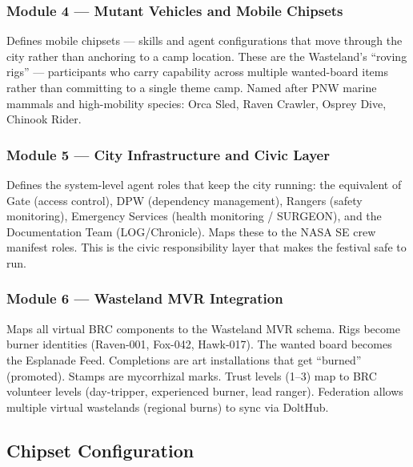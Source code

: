 \documentclass[11pt,letterpaper]{article}
\begin{document}
\subsubsection{Module 4 --- Mutant Vehicles and Mobile Chipsets}
Defines mobile chipsets --- skills and agent configurations that move through the city rather than anchoring to a camp location. These are the Wasteland's ``roving rigs'' --- participants who carry capability across multiple wanted-board items rather than committing to a single theme camp. Named after PNW marine mammals and high-mobility species: Orca Sled, Raven Crawler, Osprey Dive, Chinook Rider.

\subsubsection{Module 5 --- City Infrastructure and Civic Layer}
Defines the system-level agent roles that keep the city running: the equivalent of Gate (access control), DPW (dependency management), Rangers (safety monitoring), Emergency Services (health monitoring / SURGEON), and the Documentation Team (LOG/Chronicle). Maps these to the NASA SE crew manifest roles. This is the civic responsibility layer that makes the festival safe to run.

\subsubsection{Module 6 --- Wasteland MVR Integration}
Maps all virtual BRC components to the Wasteland MVR schema. Rigs become burner identities (Raven-001, Fox-042, Hawk-017). The wanted board becomes the Esplanade Feed. Completions are art installations that get ``burned'' (promoted). Stamps are mycorrhizal marks. Trust levels (1--3) map to BRC volunteer levels (day-tripper, experienced burner, lead ranger). Federation allows multiple virtual wastelands (regional burns) to sync via DoltHub.

\subsection{Chipset Configuration}
\end{document}
